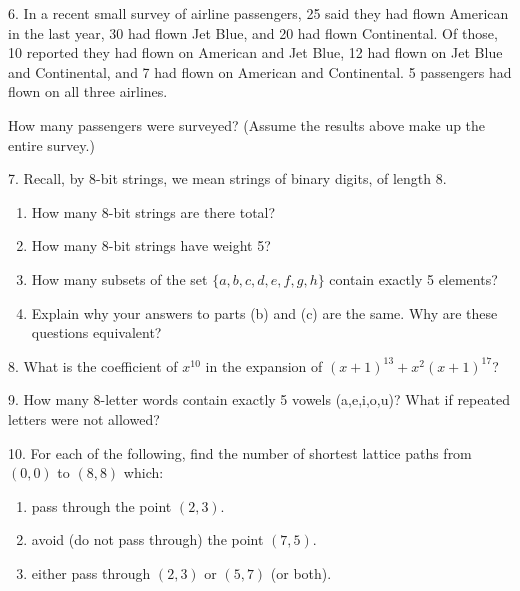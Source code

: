 \documentclass[10pt,]{book}
\theoremstyle{plain}
\theoremstyle{definition}
\numberwithin{equation}{chapter}
\begin{document}
\begin{exerciselist}
\par\smallskip
\item[6.]\hypertarget{exercise-125}{}
            In a recent small survey of airline passengers, 25 said they had flown American in the last year, 30 had flown Jet Blue, and 20 had flown Continental. Of those, 10 reported they had flown on American and Jet Blue, 12 had flown on Jet Blue and Continental, and 7 had flown on American and Continental. 5 passengers had flown on all three airlines.
\par

            How many passengers were surveyed? (Assume the results above make up the entire survey.)
\par\smallskip
\item[7.]\hypertarget{exercise-126}{}
            Recall, by \(8\)-bit strings, we mean strings of binary digits, of length 8.
            \leavevmode%
\begin{enumerate}[label=(\alph*)]
\item\hypertarget{li-440}{}
                How many \(8\)-bit strings are there total?
\item\hypertarget{li-441}{}
                How many \(8\)-bit strings have weight 5?
\item\hypertarget{li-442}{}
                How many subsets of the set \(\{a,b,c,d,e,f,g,h\}\) contain exactly 5 elements?
\item\hypertarget{li-443}{}
                Explain why your answers to parts (b) and (c) are the same. Why are these questions equivalent?
\end{enumerate}

\par\smallskip
\item[8.]\hypertarget{exercise-127}{}
            What is the coefficient of \(x^{10}\) in the expansion of \((x+1)^{13} + x^2(x+1)^{17}\)?
\par\smallskip
\item[9.]\hypertarget{exercise-128}{}
            How many 8-letter words contain exactly 5 vowels (a,e,i,o,u)? What if repeated letters were not allowed?
\par\smallskip
\item[10.]\hypertarget{exercise-129}{}
            For each of the following, find the number of shortest lattice paths from \((0,0)\) to \((8,8)\) which:
          \leavevmode%
\begin{enumerate}[label=(\alph*)]
\item\hypertarget{li-448}{}
                pass through the point \((2,3)\).
\item\hypertarget{li-449}{}
                avoid (do not pass through) the point \((7,5)\).
\item\hypertarget{li-450}{}
                either pass through \((2,3)\) or \((5,7)\) (or both).
\end{enumerate}


\end{exerciselist}
\end{document}
